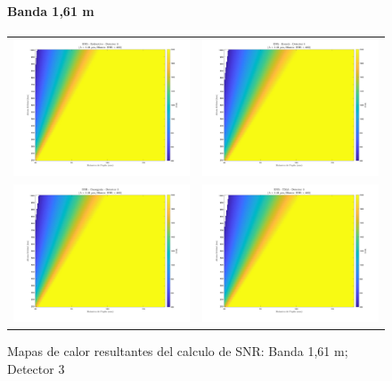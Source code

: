 \begin{landscape}
\begin{figure}[p]
\centering
\setlength{\tabcolsep}{2pt}
\renewcommand{\arraystretch}{0}

\paragraph{Banda 1,61 \textmu m}
\begin{tabular}{cc}
\includegraphics[width=0.48\linewidth]{4.Payload/SNR/SNR_Lambda1_Detector3_Telescopio1_heatmap.jpg} &
\includegraphics[width=0.48\linewidth]{4.Payload/SNR/SNR_Lambda1_Detector3_Telescopio2_heatmap.jpg} \\
\includegraphics[width=0.48\linewidth]{4.Payload/SNR/SNR_Lambda1_Detector3_Telescopio3_heatmap.jpg} &
\includegraphics[width=0.48\linewidth]{4.Payload/SNR/SNR_Lambda1_Detector3_Telescopio4_heatmap.jpg} \\
\end{tabular}
\caption{Mapas de calor resultantes del calculo de SNR: Banda 1,61 \textmu m; Detector 3}
\end{figure}
\end{landscape}


